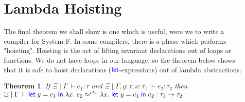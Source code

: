 \documentclass[a4paper, 11pt]{report}
\newtheorem{theorem}{Theorem}
\theoremstyle{definition}
\newcommand{\Keyword}[1]{{\color{blue} \mathsf{#1}}}
\newcommand{\var}{x}
\newcommand{\varB}{y}
\newcommand{\expr}{e}
\newcommand{\LetCmd}{\Keyword{let}}
\newcommand{\Tfunc}[2]{#1 \rightarrow #2}
\newcommand{\typ}{\tau}
\newcommand{\venv}{\Gamma}
\newcommand{\tenv}{\Xi}
\newcommand{\jdg}[4]{#1 \; | \; #2 \; \vdash #3 : #4}
\newcommand{\jdgRel}[6]{#1 \; | \; #2 \; \vdash #3 \approx^{#4} #5 : #6}
\newcommand{\ctxRel}[5]{\jdgRel{#1}{#2}{#3}{ctx}{#4}{#5}}
\begin{document}
\section{Lambda Hoisting}
The final theorem we shall show is one which is useful, were we to write a compiler for System F. In some compilers, there is a phase which performs "hoisting". Hoisting is the act of lifting invariant declarations out of loops or functions. We do not have loops in our language, so the theorem below shows that it is safe to hoist declarations ($\LetCmd$-expressions) out of lambda abstractions.
\begin{theorem}
  If $\jdg{\tenv}{\venv}{\expr_1}{\typ}$ and $\jdg{\tenv}{\venv, \varB : \typ, \var : \typ_1}{\expr_2}{\typ_2}$ then\\
  $\ctxRel{\tenv}{\venv}{\Let \varB = \expr_1 in \fun \var . \expr_2}{\fun \var . \Let \varB = \expr_1 in \expr_2}{\Tfunc{\typ_1}{\typ_2}}$
\end{theorem}
\end{document}
